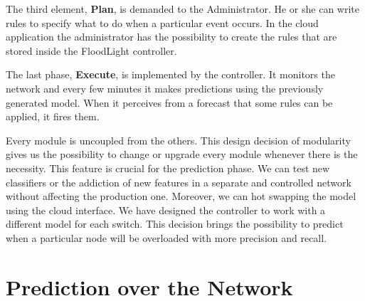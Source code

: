 \documentclass[12pt]{article}
\begin{document}
The third element, \textbf{Plan}, is demanded to the Administrator.
He or she can write rules to specify what to do when a particular event occurs.
In the cloud application the administrator has the possibility to create the rules that are stored inside the FloodLight controller.


The last phase, \textbf{Execute}, is implemented by the controller. 
It monitors the network and every few minutes it makes predictions using the previously generated model.
When it perceives from a forecast that some rules can be applied, it fires them.


Every module is uncoupled from the others. 
This design decision of modularity gives us the possibility to change or upgrade every module whenever there is the necessity.
This feature is crucial for the prediction phase.
We can test new classifiers or the addiction of new features in a separate and controlled network without affecting the production one. Moreover, we can hot swapping the model using the cloud interface.
We have designed the controller to work with a different model for each switch. 
This decision brings the possibility to predict when a particular node will be overloaded with more precision and recall.\\

 







\section{Prediction over the Network}
\end{document}
